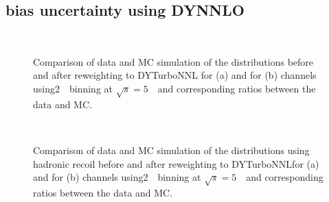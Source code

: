 \clearpage
\subsection{\ptz bias uncertainty using DYNNLO}
\label{subsec:bias_dyturbo}
\begin{figure}[h]
\centering
{}
\\
\caption{Comparison of data and MC simulation of the \ptz distributions before and after reweighting to DYTurboNNL for \Zee (a) and for \Zmm (b) channels using2~\GeV\ binning at $\sqrt{s} = 5$~\TeV\ and corresponding ratios between the data and MC.}
\label{fig:fit_DYTurboNNL_bias_Histmaker02_pt_5_2GeV}
\end{figure}
\begin{figure}[h]
\centering
{}
\\
\caption{Comparison of data and MC simulation of the \ptz distributions using hadronic recoil before and after reweighting to DYTurboNNLfor \Zee (a) and for \Zmm (b) channels using2~\GeV\ binning at $\sqrt{s} = 5$~\TeV\ and corresponding ratios between the data and MC. }
\label{fig:fit_DYTurboNNL_bias_Histmaker02_ut_5_2GeV}
\end{figure}

